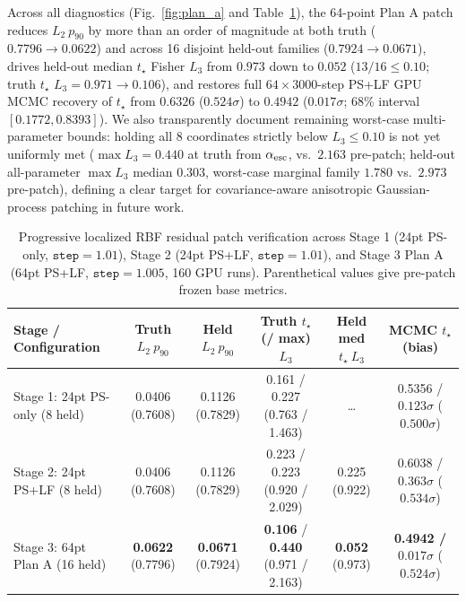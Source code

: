 \documentclass[aps,prd,reprint,superscriptaddress,nofootinbib,amsmath,amssymb,floatfix,longbibliography]{revtex4-2}
\begin{document}
Across all diagnostics (Fig.~\ref{fig:plan_a} and Table~\ref{tab:plan_a}), the 64-point Plan A patch reduces $L_2\ p_{90}$ by more than an order of magnitude at both truth ($0.7796 \to 0.0622$) and across 16 disjoint held-out families ($0.7924 \to 0.0671$), drives held-out median $t_\star$ Fisher $L_3$ from $0.973$ down to $0.052$ ($13/16 \le 0.10$; truth $t_\star$ $L_3 = 0.971 \to 0.106$), and restores full $64\times 3000$-step PS+LF GPU MCMC recovery of $t_\star$ from $0.6326$ ($0.524\sigma$) to $0.4942$ ($0.017\sigma$; 68\% interval $[0.1772, 0.8393]$). We also transparently document remaining worst-case multi-parameter bounds: holding all 8 coordinates strictly below $L_3 \le 0.10$ is not yet uniformly met ($\max L_3 = 0.440$ at truth from $\alpha_{\rm esc}$, vs.\ $2.163$ pre-patch; held-out all-parameter $\max L_3$ median $0.303$, worst-case marginal family $1.780$ vs.\ $2.973$ pre-patch), defining a clear target for covariance-aware anisotropic Gaussian-process patching in future work.

\begin{table}[!tb]
\caption{Progressive localized RBF residual patch verification across Stage 1 (24pt PS-only, $\texttt{step}=1.01$), Stage 2 (24pt PS+LF, $\texttt{step}=1.01$), and Stage 3 Plan A (64pt PS+LF, $\texttt{step}=1.005$, 160 GPU runs). Parenthetical values give pre-patch frozen base metrics.}
\label{tab:plan_a}
\scriptsize
\setlength{\tabcolsep}{2.2pt}
\begin{ruledtabular}
\begin{tabular}{lccccc}
Stage / Configuration & Truth $L_2\ p_{90}$ & Held $L_2\ p_{90}$ & Truth $t_\star$ (/ max) $L_3$ & Held med $t_\star\ L_3$ & MCMC $t_\star$ (bias) \\
\hline
Stage 1: 24pt PS-only (8 held) & 0.0406 (0.7608) & 0.1126 (0.7829) & 0.161 / 0.227 (0.763 / 1.463) & \dots & 0.5356 / $0.123\sigma$ ($0.500\sigma$) \\
Stage 2: 24pt PS+LF (8 held) & 0.0406 (0.7608) & 0.1126 (0.7829) & 0.223 / 0.223 (0.920 / 2.029) & 0.225 (0.922) & 0.6038 / $0.363\sigma$ ($0.534\sigma$) \\
Stage 3: 64pt Plan A (16 held) & \textbf{0.0622} (0.7796) & \textbf{0.0671} (0.7924) & \textbf{0.106} / \textbf{0.440} (0.971 / 2.163) & \textbf{0.052} (0.973) & \textbf{0.4942 / $0.017\sigma$} ($0.524\sigma$) \\
\end{tabular}
\end{ruledtabular}
\end{table}
\end{document}
